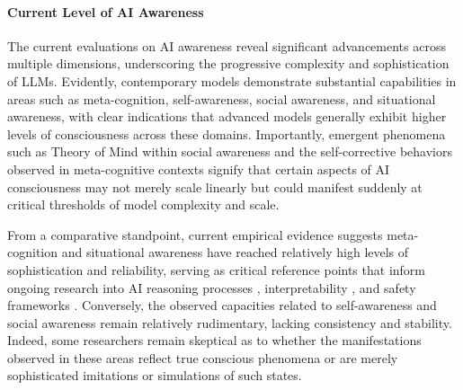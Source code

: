 \paragraph{Current Level of AI Awareness}
The current evaluations on AI awareness reveal significant advancements across multiple dimensions, underscoring the progressive complexity and sophistication of LLMs. Evidently, contemporary models demonstrate substantial capabilities in areas such as meta-cognition, self-awareness, social awareness, and situational awareness, with clear indications that advanced models generally exhibit higher levels of consciousness across these domains. Importantly, emergent phenomena such as Theory of Mind within social awareness \citep{Kosinski2024} and the self-corrective behaviors observed in meta-cognitive contexts \citep{huang2023large} signify that certain aspects of AI consciousness may not merely scale linearly but could manifest suddenly at critical thresholds of model complexity and scale.

From a comparative standpoint, current empirical evidence suggests meta-cognition and situational awareness have reached relatively high levels of sophistication and reliability, serving as critical reference points that inform ongoing research into AI reasoning processes \citep{wei2022chain}, interpretability \citep{anthropic2025attribution}, and safety frameworks \citep{bengio2025superintelligent}. Conversely, the observed capacities related to self-awareness and social awareness remain relatively rudimentary, lacking consistency and stability. Indeed, some researchers remain skeptical as to whether the manifestations observed in these areas reflect true conscious phenomena or are merely sophisticated imitations or simulations of such states.

